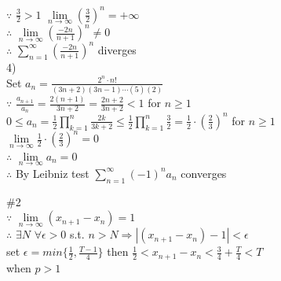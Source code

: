 \documentclass{article}
\begin{document}
$\because$ \qquad $\displaystyle \frac{3}{2} > 1$ \quad $\displaystyle \lim \limits_{n \to \infty} \left(\frac{3}{2}\right)^n = +\infty$\\

$\therefore$ \qquad $\displaystyle \lim \limits_{n \to \infty} \left(\frac{-2n}{n+1}\right)^n \neq 0$\\

$\therefore$ \qquad $\displaystyle \sum \limits_{n=1}^\infty \left(\frac{-2n}{n+1}\right)^n$ \quad diverges\\

4)\\

Set $a_n = \frac{2^n \cdot n!}{(3n+2)(3n-1)\cdots(5)(2)}$\\

$\because$ \qquad $\displaystyle \frac{a_{n+1}}{a_n} = \frac{2(n+1)}{3n+2} = \frac{2n+2}{3n+2} < 1$ for $n \geq 1$\\

\hskip 1.1cm $\displaystyle 0 \leq a_n = \frac{1}{2} \prod_{k=1}^n \frac{2k}{3k+2} \leq \frac{1}{2} \prod_{k=1}^n \frac{3}{2} = \frac{1}{2} \cdot \left(\frac{2}{3}\right)^n$ for $n \geq 1$\\

\hskip 1.1cm $\displaystyle \lim \limits_{n \to \infty} \frac{1}{2} \cdot \left(\frac{2}{3}\right)^n = 0$\\

$\therefore$ \qquad $\displaystyle \lim \limits_{n \to \infty} a_n = 0$\\

$\therefore$ \qquad By Leibniz test \quad $\sum \limits_{n=1}^\infty (-1)^n a_n$ \quad converges\\

\vskip 3cm

\textcolor[rgb]{0.00,0.00,0.50}{\#2}\\

$\because$ \qquad $\displaystyle \lim \limits_{n \to \infty} (x_{n+1} - x_n) = 1$\\

$\therefore$ \qquad $\exists N$ \quad $\forall \epsilon > 0$ \quad s.t. \quad $n>N \Rightarrow |(x_{n+1} - x_n) - 1| < \epsilon$\\

set $\epsilon = min\{\frac{1}{2}, \frac{T-1}{4}\}$ \quad then $\frac{1}{2} < x_{n+1} - x_n < \frac{3}{4} + \frac{T}{4} < T$\\

when $p > 1$\\
\end{document}
